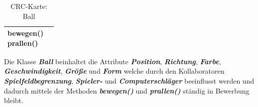 \documentclass[a4paper,12pt]{article}
\begin{document}
\begin{multicols}{2}
\begin{table}[H]
\begin{tabular}{|l|c|}
\cline{1-1}
\makecell[t]{bewegen() \\ prallen()} & \\
\hline
\end{tabular}
\caption{CRC-Karte: Ball}
\label{tab:crc-karte-ball}
\end{table}
Die Klasse \textit{\textbf{Ball}} beinhaltet die Attribute \textit{\textbf{Position}}, \textit{\textbf{Richtung}}, \textit{\textbf{Farbe}}, \textit{\textbf{Geschwindigkeit}}, \textit{\textbf{Größe}} und \textit{\textbf{Form}} welche durch den Kollaboratoren \textit{\textbf{Spielfeldbegrenzung}}, \textit{\textbf{Spieler-}} und \textit{\textbf{Computerschläger}} beeinflusst werden und dadurch mittels der Methoden \textit{\textbf{bewegen()}} und \textit{\textbf{prallen()}} ständig in Bewerbung bleibt.
\end{multicols}
\clearpage
\end{document}
